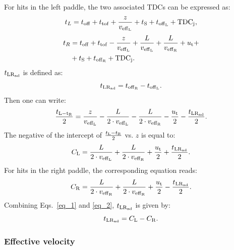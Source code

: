 For hits in the left paddle, the two associated TDCs can be expressed as:
\begin{equation}\label{time_of_hits}
t_L=t_{\rm{off}}+t_{\rm{tof}}+\frac{z}{v_{\rm{eff}_L}}+t_{\rm{S}}+t_{\rm{off}_{\rm{L}}}+{\rm{TDC}}_{\rm{j}},
\end{equation}
\begin{equation}
\begin{aligned}  
  t_R&= t_{\rm{off}}+t_{\rm{tof}}-\frac{z}{v_{\rm{eff}_L}}+\frac{L}{v_{\rm{eff}_L}}+\frac{L}{v_{\rm{eff}_{\rm{R}}}}+u_{\rm{t}}+\\ 
  &+t_{\rm{S}}+t_{\rm{off}_{\rm{R}}}+{\rm{TDC}}_{\rm{j}}.
\end{aligned}
\end{equation}
%
$t_{\rm{LR}_{\rm{ad}}}$ is defined as:
\begin{equation}
t_{\rm{LR}_{\rm{ad}}}=t_{\rm{off}_{\rm{R}}}-t_{\rm{off}_{\rm{L}}}.
\end{equation}
%
Then one can write:
\begin{equation}
\frac{t_{\rm{L}-t_{\rm{R}}}}{2}=\frac{z}{v_{\rm{eff}_{\rm{L}}}}-\frac{L}{2\cdot v_{\rm{eff}_{\rm{L}}}}-\frac{L}{2\cdot v_{\rm{eff}_{\rm{R}}}}-\frac{u_{\rm{t}}}{2}-\frac{t_{\rm{LR}_{\rm{ad}}}}{2}.
\end{equation}
The negative of the intercept of $\frac{t_{\rm{L}}-t_{\rm{R}}}{2}$ vs. $z$ is equal to:
\begin{equation}
\label{eq_1}
C_{\rm{L}}=\frac{L}{2\cdot v_{\rm{eff}_{\rm{L}}}}+\frac{L}{2\cdot v_{\rm{eff}_{\rm{R}}}}+\frac{u_{\rm{t}}}{2}+\frac{t_{\rm{LR}_{\rm{ad}}}}{2}.
\end{equation}
For hits in the right paddle, the corresponding equation reads:
\begin{equation}
\label{eq_2}
C_{\rm{R}}=\frac{L}{2\cdot v_{\rm{eff}_{\rm{R}}}}+\frac{L}{2\cdot v_{\rm{eff}_{\rm{R}}}}+\frac{u_{\rm{t}}}{2}-\frac{t_{\rm{LR}_{\rm{ad}}}}{2}.
\end{equation}
Combining Eqs.~\ref{eq_1} and \ref{eq_2}, $t_{\rm{LR}_{\rm{ad}}}$ is given by:
\begin{equation}
t_{\rm{LR}_{\rm{ad}}}=C_{\rm{L}}-C_{\rm{R}}.
\end{equation}

\subsubsection{Effective velocity }

